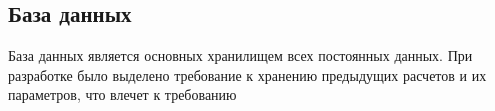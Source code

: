 \subsection{База данных}
База данных является основных хранилищем всех постоянных  данных. При разработке было выделено требование к хранению  предыдущих расчетов и их параметров, что влечет к требованию  
